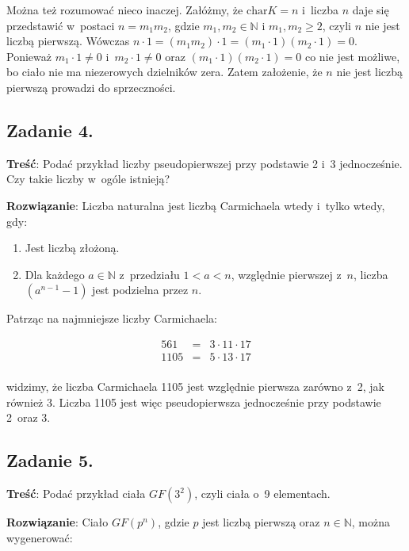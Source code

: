 \documentclass[a4paper,10pt, twocolumn]{article}
\begin{document}
Można też rozumować nieco inaczej. Załóżmy, że $\text{char} K = n$ i~liczba $n$ daje się przedstawić w~postaci $n = m_{1}m_{2}$, gdzie $m_{1}, m_{2} \in \mathbb{N}$ i $m_{1}, m_{2} \geq 2$, czyli $n$ nie jest liczbą pierwszą. Wówczas $n \cdot 1 = (m_{1}m_{2}) \cdot 1 = (m_{1} \cdot 1)(m_{2} \cdot 1) = 0$. Ponieważ $m_{1} \cdot 1 \neq 0$ i~$m_{2} \cdot 1 \neq 0$ oraz $(m_{1} \cdot 1)(m_{2} \cdot 1) = 0$ co nie jest możliwe, bo ciało nie ma niezerowych dzielników zera. Zatem założenie, że $n$ nie jest liczbą pierwszą prowadzi do sprzeczności.

\subsection{Zadanie 4.}

\textbf{Treść}: Podać przykład liczby pseudopierwszej przy podstawie 2 i~3 jednocześnie. Czy takie liczby w~ogóle istnieją?

\textbf{Rozwiązanie}: Liczba naturalna jest liczbą Carmichaela wtedy i~tylko wtedy, gdy:

\begin{enumerate}
 \item Jest liczbą złożoną.
 \item Dla każdego $a \in \mathbb{N}$ z~przedziału $1 < a < n$, względnie pierwszej z~$n$, liczba $(a^{n-1} - 1)$ jest podzielna przez $n$.
\end{enumerate}

Patrząc na najmniejsze liczby Carmichaela:

\begin{equation*}
 \begin{array}{lcl} 561& = & 3 \cdot 11 \cdot 17 \\ 1105 & = & 5 \cdot 13 \cdot 17 \\ \end{array}
\end{equation*}

\noindent widzimy, że liczba Carmichaela 1105 jest względnie pierwsza zarówno z~2, jak również 3. Liczba 1105 jest więc pseudopierwsza jednocześnie przy podstawie 2~oraz 3.

\subsection{Zadanie 5.}

\textbf{Treść}: Podać przykład ciała $GF(3^{2})$, czyli ciała o~9 elementach.

\textbf{Rozwiązanie}: Ciało $GF(p^{n})$, gdzie $p$ jest liczbą pierwszą oraz $n \in \mathbb{N}$, można wygenerować:
\end{document}

